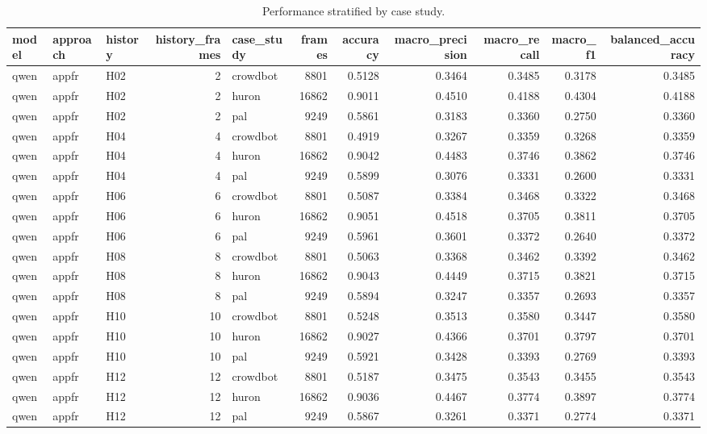\begin{table}[tbp]
\caption{Performance stratified by case study.}
\label{tab:rq1_descriptive_case_study}
\begin{tabular}{lllrlrrrrrr}
\toprule
model & approach & history & history\_frames & case\_study & frames & accuracy & macro\_precision & macro\_recall & macro\_f1 & balanced\_accuracy \\
\midrule
qwen & appfr & H02 & 2 & crowdbot & 8801 & 0.5128 & 0.3464 & 0.3485 & 0.3178 & 0.3485 \\
qwen & appfr & H02 & 2 & huron & 16862 & 0.9011 & 0.4510 & 0.4188 & 0.4304 & 0.4188 \\
qwen & appfr & H02 & 2 & pal & 9249 & 0.5861 & 0.3183 & 0.3360 & 0.2750 & 0.3360 \\
qwen & appfr & H04 & 4 & crowdbot & 8801 & 0.4919 & 0.3267 & 0.3359 & 0.3268 & 0.3359 \\
qwen & appfr & H04 & 4 & huron & 16862 & 0.9042 & 0.4483 & 0.3746 & 0.3862 & 0.3746 \\
qwen & appfr & H04 & 4 & pal & 9249 & 0.5899 & 0.3076 & 0.3331 & 0.2600 & 0.3331 \\
qwen & appfr & H06 & 6 & crowdbot & 8801 & 0.5087 & 0.3384 & 0.3468 & 0.3322 & 0.3468 \\
qwen & appfr & H06 & 6 & huron & 16862 & 0.9051 & 0.4518 & 0.3705 & 0.3811 & 0.3705 \\
qwen & appfr & H06 & 6 & pal & 9249 & 0.5961 & 0.3601 & 0.3372 & 0.2640 & 0.3372 \\
qwen & appfr & H08 & 8 & crowdbot & 8801 & 0.5063 & 0.3368 & 0.3462 & 0.3392 & 0.3462 \\
qwen & appfr & H08 & 8 & huron & 16862 & 0.9043 & 0.4449 & 0.3715 & 0.3821 & 0.3715 \\
qwen & appfr & H08 & 8 & pal & 9249 & 0.5894 & 0.3247 & 0.3357 & 0.2693 & 0.3357 \\
qwen & appfr & H10 & 10 & crowdbot & 8801 & 0.5248 & 0.3513 & 0.3580 & 0.3447 & 0.3580 \\
qwen & appfr & H10 & 10 & huron & 16862 & 0.9027 & 0.4366 & 0.3701 & 0.3797 & 0.3701 \\
qwen & appfr & H10 & 10 & pal & 9249 & 0.5921 & 0.3428 & 0.3393 & 0.2769 & 0.3393 \\
qwen & appfr & H12 & 12 & crowdbot & 8801 & 0.5187 & 0.3475 & 0.3543 & 0.3455 & 0.3543 \\
qwen & appfr & H12 & 12 & huron & 16862 & 0.9036 & 0.4467 & 0.3774 & 0.3897 & 0.3774 \\
qwen & appfr & H12 & 12 & pal & 9249 & 0.5867 & 0.3261 & 0.3371 & 0.2774 & 0.3371 \\

\end{tabular}
\end{table}
